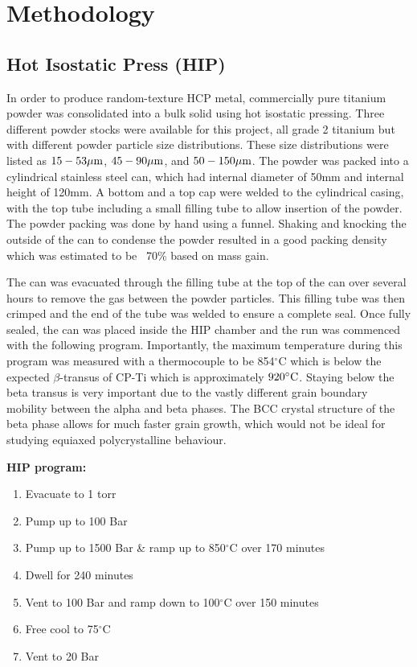 \chapter{Methodology}

\section{Hot Isostatic Press (HIP)}
In order to produce random-texture HCP metal, commercially pure titanium powder was consolidated into a bulk solid using hot isostatic pressing.
Three different powder stocks were available for this project, all grade 2 titanium but with different powder particle size distributions.
These size distributions were listed as $15-53\mu\textnormal{m}$, $45-90\mu\textnormal{m}$, and $50-150\mu\textnormal{m}$.
The powder was packed into a cylindrical stainless steel can, which had internal diameter of 50mm and internal height of 120mm.
A bottom and a top cap were welded to the cylindrical casing, with the top tube including a small filling tube to allow insertion of the powder.
The powder packing was done by hand using a funnel. Shaking and knocking the outside of the can to condense the powder resulted in a good packing density which was estimated to be ~70\% based on mass gain.

The can was evacuated through the filling tube at the top of the can over several hours to remove the gas between the powder particles.
This filling tube was then crimped and the end of the tube was welded to ensure a complete seal.
Once fully sealed, the can was placed inside the HIP chamber and the run was commenced with the following program.
Importantly, the maximum temperature during this program was measured with a thermocouple to be 854$^\circ$C which is below the expected $\beta$-transus of CP-Ti which is approximately $920^\circ\textnormal{C}$.
Staying below the beta transus is very important due to the vastly different grain boundary mobility between the alpha and beta phases.
The BCC crystal structure of the beta phase allows for much faster grain growth, which would not be ideal for studying equiaxed polycrystalline behaviour.
\pagebreak

\textbf{HIP program:}
\begin{enumerate}
    \item Evacuate to 1 torr
    \item Pump up to 100 Bar
    \item Pump up to 1500 Bar \& ramp up to 850$^\circ$C over 170 minutes 
    \item Dwell for 240 minutes
    \item Vent to 100 Bar and ramp down to 100$^\circ$C over 150 minutes
    \item Free cool to 75$^\circ$C
    \item Vent to 20 Bar
\end{enumerate}

